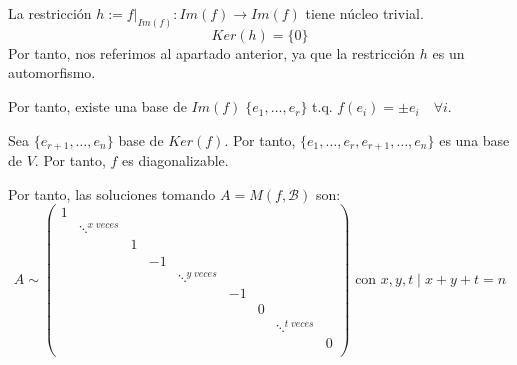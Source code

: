 \begin{ejercicio}
\begin{itemize}
        La restricción $h:=f|_{Im(f)}:Im(f) \to Im(f)$ tiene núcleo trivial.
        $$Ker(h)=\{0\}$$
        Por tanto, nos referimos al apartado anterior, ya que la restricción $h$ es un automorfismo.
        
        Por tanto, existe una base de $Im(f)\;\{e_1, \dots, e_r\}$ t.q. $f(e_i)=\pm e_i\quad \forall i$.

        Sea $\{e_{r+1}, \dots, e_n\}$ base de $Ker(f)$.  Por tanto, $\{e_1, \dots, e_r, e_{r+1}, \dots, e_n\}$ es una base de $V$. Por tanto, $f$ es diagonalizable.
        
        Por tanto, las soluciones tomando $A=M(f, \mathcal{B})$ son:
        \begin{equation*}
            A\sim \left(\begin{array}{ccccccccc}
                1&&&&&&&&\\
                &\ddots^{x\;veces}&&&&&&&\\
                &&1&&&&&&\\
                &&&-1&&&&&\\
                &&&&\ddots^{y\;veces}&&&&\\
                &&&&&-1&&&\\
                &&&&&&0&&\\
                &&&&&&&\ddots^{t\;veces}&\\
                &&&&&&&&0\\
            \end{array} \right) \text{ con $x,y,t\mid x+y+t=n$}
        \end{equation*}
    \end{itemize}
\end{ejercicio}

